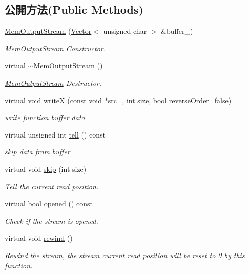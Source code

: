 \subsection*{公開方法(Public Methods)}
\begin{DoxyCompactItemize}
\item 
\hyperlink{class_magnum_1_1_mem_output_stream_a47f9054625e2ffa1b939a5d0c2b7e5f6}{Mem\+Output\+Stream} (\hyperlink{class_magnum_1_1_vector}{Vector}$<$ unsigned char $>$ \&buffer\+\_\+)
\begin{DoxyCompactList}\small\item\em \hyperlink{class_magnum_1_1_mem_output_stream}{Mem\+Output\+Stream} Constructor. \end{DoxyCompactList}\item 
virtual \hyperlink{class_magnum_1_1_mem_output_stream_ad7b29041f995fce6fddd84c88064b7c1}{$\sim$\+Mem\+Output\+Stream} ()
\begin{DoxyCompactList}\small\item\em \hyperlink{class_magnum_1_1_mem_output_stream}{Mem\+Output\+Stream} Destructor. \end{DoxyCompactList}\item 
virtual void \hyperlink{class_magnum_1_1_mem_output_stream_ad55c8d9ab626c7813d4e462058f373e4}{writeX} (const void $\ast$src\+\_\+, int size, bool reverse\+Order=false)
\begin{DoxyCompactList}\small\item\em write function buffer data \end{DoxyCompactList}\item 
virtual unsigned int \hyperlink{class_magnum_1_1_mem_output_stream_a23b7bf69ae892e46af025620d7c66220}{tell} () const 
\begin{DoxyCompactList}\small\item\em skip data from buffer \end{DoxyCompactList}\item 
virtual void \hyperlink{class_magnum_1_1_mem_output_stream_a4c9a681b50dc976a0750705319659553}{skip} (int size)
\begin{DoxyCompactList}\small\item\em Tell the current read position. \end{DoxyCompactList}\item 
virtual bool \hyperlink{class_magnum_1_1_mem_output_stream_aebe23ef0fd8c8b99352fb301e4596573}{opened} () const 
\begin{DoxyCompactList}\small\item\em Check if the stream is opened. \end{DoxyCompactList}\item 
virtual void \hyperlink{class_magnum_1_1_mem_output_stream_af786069f281ed927c62ca433579b8051}{rewind} ()
\begin{DoxyCompactList}\small\item\em Rewind the stream, the stream current read position will be reset to 0 by this function. \end{DoxyCompactList}\end{DoxyCompactItemize}

